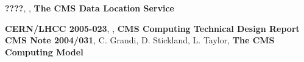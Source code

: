 \documentclass[pdftex]{cmspaper}
\begin{document}
\begin{thebibliography}{9}
   {\bf ????}, , {\bf The CMS Data Location Service} 
  
   {\bf CERN/LHCC 2005-023}, , {\bf CMS Computing Technical Design Report}
   {\bf CMS Note 2004/031}, C. Grandi, D. Stickland,
               L. Taylor, {\bf The CMS Computing Model}

\end{thebibliography}
 
\pagebreak
\end{document}
